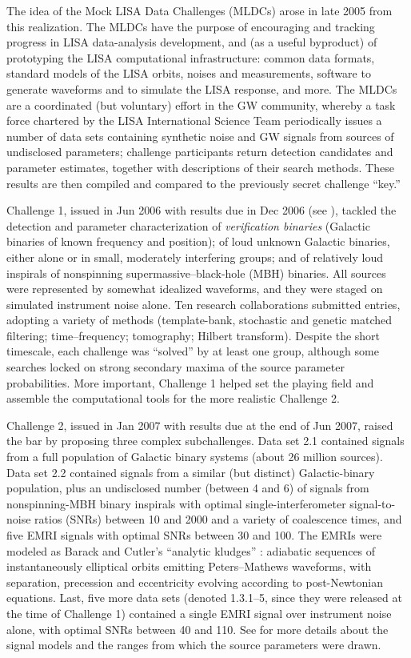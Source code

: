 \documentclass{iopart}
\begin{document}
The idea of the Mock LISA Data Challenges (MLDCs) arose in late 2005 from this realization. The MLDCs have the purpose of encouraging and tracking progress in LISA data-analysis development, and (as a useful byproduct) of prototyping the LISA computational infrastructure: common data formats, standard models of the LISA orbits, noises and measurements, software to generate waveforms and to simulate the LISA response, and more.
The MLDCs are a coordinated (but voluntary) effort in the GW community, whereby a task force chartered by the LISA International Science Team periodically issues a number of data sets containing synthetic noise and GW signals from sources of undisclosed parameters; challenge participants return detection candidates and parameter estimates, together with descriptions of their search methods. These results are then compiled and compared to the previously secret challenge ``key.''

Challenge 1, issued in Jun 2006 with results due in Dec 2006 (see \cite{mldclisasymp,mldcgwdaw1}), tackled the detection and parameter characterization of \emph{verification binaries} (Galactic binaries of known frequency and position); of loud unknown Galactic binaries, either alone or in small, moderately interfering groups; and of relatively loud inspirals of nonspinning supermassive--black-hole (MBH) binaries. All sources were represented by somewhat idealized waveforms, and they were staged on simulated instrument noise alone. Ten research collaborations submitted entries, adopting a variety of methods (template-bank, stochastic and genetic matched filtering; time--frequency; tomography; Hilbert transform). Despite the short timescale, each challenge was ``solved'' by at least one group, although some searches locked on strong secondary maxima of the source parameter probabilities. More important, Challenge 1 helped set the playing field and assemble the computational tools for the more realistic Challenge 2.

Challenge 2, issued in Jan 2007 with results due at the end of Jun 2007, raised the bar by proposing three complex subchallenges. Data set 2.1 contained signals from a full population of Galactic binary systems (about 26 million sources). Data set 2.2 contained signals from a similar (but distinct) Galactic-binary population,
plus an undisclosed number (between 4 and 6) of signals from nonspinning-MBH binary inspirals with optimal single-interferometer signal-to-noise ratios (SNRs) between 10 and 2000 and a variety of coalescence times, and five EMRI signals with optimal SNRs between 30 and 100. The EMRIs were modeled as Barack and Cutler's ``analytic kludges'' \cite{barackcutler}: adiabatic sequences of instantaneously elliptical orbits emitting Peters--Mathews waveforms, with separation, precession and eccentricity evolving according to post-Newtonian equations.
Last, five more data sets (denoted 1.3.1--5, since they were released at the time of Challenge 1) contained a single EMRI signal over instrument noise alone, with optimal SNRs between 40 and 110. See \cite{mldcgwdaw2} for more details about the signal models and the ranges from which the source parameters were drawn.
\end{document}
